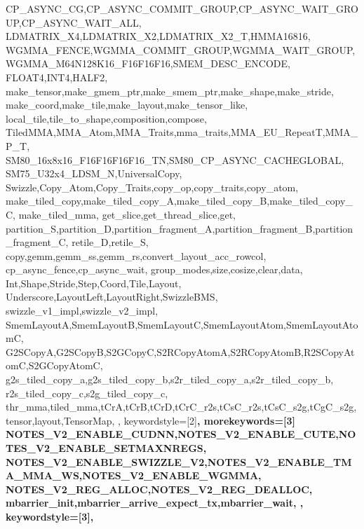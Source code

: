 {{    CP_ASYNC_CG,CP_ASYNC_COMMIT_GROUP,CP_ASYNC_WAIT_GROUP,CP_ASYNC_WAIT_ALL,
    LDMATRIX_X4,LDMATRIX_X2,LDMATRIX_X2_T,HMMA16816,
    WGMMA_FENCE,WGMMA_COMMIT_GROUP,WGMMA_WAIT_GROUP,
    WGMMA_M64N128K16_F16F16F16,SMEM_DESC_ENCODE,
    FLOAT4,INT4,HALF2,
    make_tensor,make_gmem_ptr,make_smem_ptr,make_shape,make_stride,
    make_coord,make_tile,make_layout,make_tensor_like,
    local_tile,tile_to_shape,composition,compose,
    TiledMMA,MMA_Atom,MMA_Traits,mma_traits,MMA_EU_RepeatT,MMA_P_T,
    SM80_16x8x16_F16F16F16F16_TN,SM80_CP_ASYNC_CACHEGLOBAL,
    SM75_U32x4_LDSM_N,UniversalCopy,
    Swizzle,Copy_Atom,Copy_Traits,copy_op,copy_traits,copy_atom,
    make_tiled_copy,make_tiled_copy_A,make_tiled_copy_B,make_tiled_copy_C,
    make_tiled_mma,
    get_slice,get_thread_slice,get,
    partition_S,partition_D,partition_fragment_A,partition_fragment_B,partition_fragment_C,
    retile_D,retile_S,
    copy,gemm,gemm_ss,gemm_rs,convert_layout_acc_rowcol,
    cp_async_fence,cp_async_wait,
    group_modes,size,cosize,clear,data,
    Int,Shape,Stride,Step,Coord,Tile,Layout,
    Underscore,LayoutLeft,LayoutRight,SwizzleBMS,
    swizzle_v1_impl,swizzle_v2_impl,
    SmemLayoutA,SmemLayoutB,SmemLayoutC,SmemLayoutAtom,SmemLayoutAtomC,
    G2SCopyA,G2SCopyB,S2GCopyC,S2RCopyAtomA,S2RCopyAtomB,R2SCopyAtomC,S2GCopyAtomC,
    g2s_tiled_copy_a,g2s_tiled_copy_b,s2r_tiled_copy_a,s2r_tiled_copy_b,
    r2s_tiled_copy_c,s2g_tiled_copy_c,
    thr_mma,tiled_mma,tCrA,tCrB,tCrD,tCrC_r2s,tCsC_r2s,tCsC_s2g,tCgC_s2g,
    tensor,layout,TensorMap,
  },
  keywordstyle=[2]\bfseries\color{vscEmphasis},
  morekeywords=[3]{
    NOTES_V2_ENABLE_CUDNN,NOTES_V2_ENABLE_CUTE,NOTES_V2_ENABLE_SETMAXNREGS,
    NOTES_V2_ENABLE_SWIZZLE_V2,NOTES_V2_ENABLE_TMA_MMA_WS,NOTES_V2_ENABLE_WGMMA,
    NOTES_V2_REG_ALLOC,NOTES_V2_REG_DEALLOC,
    mbarrier_init,mbarrier_arrive_expect_tx,mbarrier_wait,
  },
  keywordstyle=[3]\bfseries\color{vscAccent},
}


